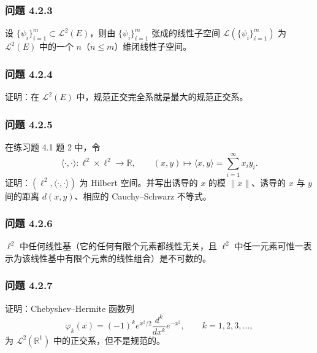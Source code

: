 \documentclass[11pt,a4paper]{article}
\begin{document}
\subsubsection{问题 4.2.3}\label{ch04-practice-ux95eeux9898-4.2.3}

设 \(\{\psi_i\}_{i=1}^m\subset\mathcal L^2(E)\)，则由
\(\{\psi_i\}_{i=1}^m\) 张成的线性子空间
\(\mathcal L(\{\psi_i\}_{i=1}^m)\) 为 \(\mathcal L^2(E)\) 中的一个
\(n\)（\(n\le m\)）维闭线性子空间。

\subsubsection{问题 4.2.4}\label{ch04-practice-ux95eeux9898-4.2.4}

证明：在 \(\mathcal L^2(E)\) 中，规范正交完全系就是最大的规范正交系。

\subsubsection{问题 4.2.5}\label{ch04-practice-ux95eeux9898-4.2.5}

在练习题 4.1 题 2 中，令 \[
\langle\cdot,\cdot\rangle:\ell^2\times\ell^2\to\mathbb R,\qquad
(x,y)\mapsto\langle x,y\rangle=\sum_{i=1}^\infty x_iy_i.
\] 证明：\((\ell^2,\langle\cdot,\cdot\rangle)\) 为 Hilbert
空间。并写出诱导的 \(x\) 的模 \(\|x\|\)、诱导的 \(x\) 与 \(y\) 间的距离
\(d(x,y)\)、相应的 Cauchy--Schwarz 不等式。

\subsubsection{问题 4.2.6}\label{ch04-practice-ux95eeux9898-4.2.6}

\(\ell^2\) 中任何线性基（它的任何有限个元素都线性无关，且 \(\ell^2\)
中任一元素可惟一表示为该线性基中有限个元素的线性组合）是不可数的。

\subsubsection{问题 4.2.7}\label{ch04-practice-ux95eeux9898-4.2.7}

证明：Chebyshev--Hermite 函数列 \[
\varphi_k(x)=(-1)^k e^{x^2/2}\frac{d^k}{dx^k}e^{-x^2},\qquad k=1,2,3,\ldots,
\] 为 \(\mathcal L^2(\mathbb R^1)\) 中的正交系，但不是规范的。

\end{document}
